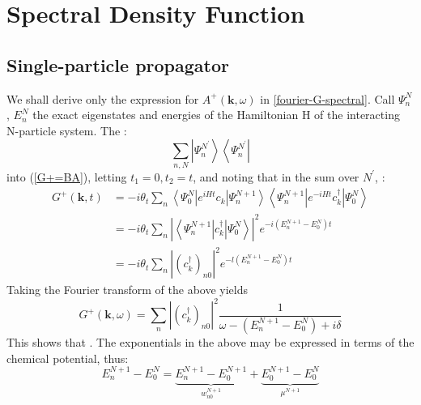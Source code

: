 \newpage
\section{Spectral Density Function}
\subsection{Single-particle propagator}
We shall derive only the expression for $A^{+}(\mathbf{k},\omega)$ in \ref{fourier-G-spectral}. Call $\Psi_n^{N}$, $E_n^{N}$ the exact eigenstates and energies of the Hamiltonian H of the interacting N-particle system. The :
$$\sum_{n, N}\left|\Psi_{n}^{N^{\prime}}\right\rangle\left\langle\Psi_{n}^{N^{\prime}}\right|$$
into (\ref{G+=BA}), letting $t_1=0,t_2=t$, and noting that in the sum over $N^{\prime}$, :
\begin{equation}\begin{aligned}
G^{+}(\mathbf{k}, t) &=-i \theta_{t} \sum_{n}\left\langle\Psi_{0}^{N}\left|e^{i H t} c_{k}\right| \Psi_{n}^{N+1}\right\rangle\left\langle\Psi_{n}^{N+1}\left|e^{-i H t} c_{k}^{\dagger}\right| \Psi_{0}^{N}\right\rangle \\
&=-i \theta_{t} \sum_{n}\left|\left\langle\Psi_{n}^{N+1}\left|c^{\dagger}_{k}\right| \Psi_{0}^{N}\right\rangle\right|^{2} e^{-i\left(E_{n}^{N+1}-E_{0}^{N}\right) t} \\
&=-i \theta_{t} \sum_{n}\left|\left(c_{k}^{\dagger}\right)_{n 0}\right|^{2} e^{-l\left(E_{n}^{N+1}-E_{0}^{N}\right) t}
\end{aligned}\end{equation}
Taking the Fourier transform of the above yields
\begin{equation}G^{+}(\mathbf{k}, \omega)=\sum_{n}\left|\left(c_{k}^{\dagger}\right)_{n 0}\right|^{2} \frac{1}{\omega-\left(E_{n}^{N+1}-E_{0}^{N}\right)+i \delta}\end{equation}
This shows that .
The exponentials in the above may be expressed in terms of the chemical potential, thus:
\begin{equation}E_{n}^{N+1}-E_{0}^{N}=\underbrace{E_{n}^{N+1}-E_{0}^{N+1}}_{w_{n 0}^{N+1}}+\underbrace{E_{0}^{N+1}-E_{0}^{N}}_{\mu^{N+1}}\end{equation}
